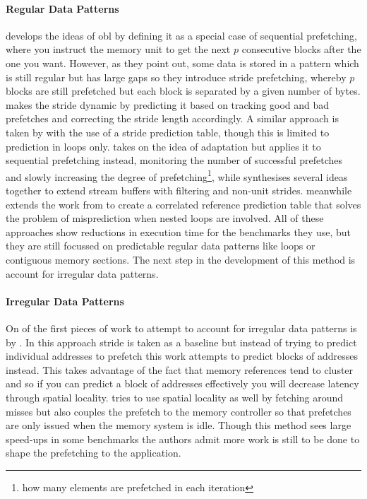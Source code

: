 \paragraph{Regular Data Patterns}

\citet{fuDataPrefetchingMultiprocessor1991} develops the ideas of \gls{obl} by defining it as a special case of sequential prefetching, where you instruct the memory unit to get the next $p$ consecutive blocks after the one you want. However, as they point out, some data is stored in a pattern which is still regular but has large gaps so they introduce stride prefetching, whereby $p$ blocks are still prefetched but each block is separated by a given number of bytes. \citet{baerEffectiveOnchipPreloading1991} makes the stride dynamic by predicting it based on tracking good and bad prefetches and correcting the stride length accordingly. A similar approach is taken by \citet{fuStrideDirectedPrefetching1992} with the use of a stride prediction table, though this is limited to prediction in loops only. \citet{dahlgrenFixedAdaptiveSequential1993} takes on the idea of adaptation but applies it to sequential prefetching instead, monitoring the number of successful prefetches and slowly increasing the degree of prefetching\footnote{how many elements are prefetched in each iteration}, while \citet{palacharlaEvaluatingStreamBuffers1994} synthesises several ideas together to extend stream buffers with filtering and non-unit strides. \citet{chenEffectiveHardwarebasedData1995} meanwhile extends the work from \citeyear{baerEffectiveOnchipPreloading1991}\cite{baerEffectiveOnchipPreloading1991} to create a correlated reference prediction table that solves the problem of misprediction when nested loops are involved. All of these approaches show reductions in execution time for the benchmarks they use, but they are still focussed on predictable regular data patterns like loops or contiguous memory sections. The next step in the development of this method is account for irregular data patterns.

\paragraph{Irregular Data Patterns}

On of the first pieces of work to attempt to account for irregular data patterns is by \citet{alexanderDistributedPrefetchbufferCache1996}. In this approach stride is taken as a baseline but instead of trying to predict individual addresses to prefetch this work attempts to predict blocks of addresses instead. This takes advantage of the fact that memory references tend to cluster and so if you can predict a block of addresses effectively you will decrease latency through spatial locality. \citet{linReducingDRAMLatencies2001} tries to use spatial locality as well by fetching around misses but also couples the prefetch to the memory controller so that prefetches are only issued when the memory system is idle. Though this method sees large speed-ups in some benchmarks the authors admit more work is still to be done to shape the prefetching to the application.

